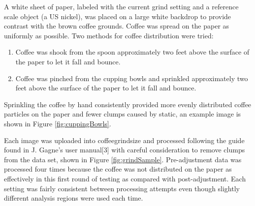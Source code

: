 \documentclass[10pt,a4paper,twocolumn,notitlepage]{article}
\begin{document}
A white sheet of paper, labeled with the current grind setting and a reference scale object (a US nickel), was placed on a large white backdrop to provide contrast with the brown coffee grounds. Coffee was spread on the paper as uniformly as possible. Two methods for coffee distribution were tried:

\begin{enumerate}
\item Coffee was shook from the spoon approximately two feet above the surface of the paper to let it fall and bounce.
\item Coffee was pinched from the cupping bowls and sprinkled approximately two feet above the surface of the paper to let it fall and bounce.
\end{enumerate}

Sprinkling the coffee by hand consistently provided more evenly distributed coffee particles on the paper and fewer clumps caused by static, an example image is shown in Figure \ref{fig:cuppingBowls}.

Each image was uploaded into coffeegrindsize and processed following the guide found in J. Gagne's user manual[3] with careful consideration to remove clumps from the data set, shown in Figure \ref{fig:grindSample}. Pre-adjustment data was processed four times because the coffee was not distributed on the paper as effectively in this first round of testing as compared with post-adjustment. Each setting was fairly consistent between processing attempts even though slightly different analysis regions were used each time. 
\end{document}
